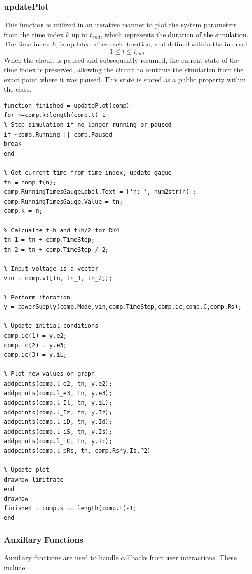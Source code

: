 \subsubsection{updatePlot}
This function is utilized in an iterative manner to plot the system parameters from the time index $k$ up to $t_{end}$, which represents the duration of the simulation. The time index $k$, is updated after each iteration, and defined within the interval $$1 \leq t \leq t_{end}$$ When the circuit is paused and subsequently resumed, the current state of the time index is preserved, allowing the circuit to continue the simulation from the exact point where it was paused. This state is stored as a public property within the class.
\begin{lstlisting}[caption=Helper function thats used to simulate the circuit after a given time index $k$]
function finished = updatePlot(comp)
for n=comp.k:length(comp.t)-1
% Stop simulation if no longer running or paused
if ~comp.Running || comp.Paused
break
end

% Get current time from time index, update gague
tn = comp.t(n);
comp.RunningTimesGaugeLabel.Text = ['n: ', num2str(n)];
comp.RunningTimesGauge.Value = tn;
comp.k = n;

% Calcualte t+h and t+h/2 for RK4
tn_1 = tn + comp.TimeStep;
tn_2 = tn + comp.TimeStep / 2;

% Input voltage is a vector
vin = comp.v([tn, tn_1, tn_2]);

% Perform iteration
y = powerSupply(comp.Mode,vin,comp.TimeStep,comp.ic,comp.C,comp.Rs);

% Update initial conditions
comp.ic(1) = y.e2;
comp.ic(2) = y.e3;
comp.ic(3) = y.iL;

% Plot new values on graph
addpoints(comp.l_e2, tn, y.e2);
addpoints(comp.l_e3, tn, y.e3);
addpoints(comp.l_Il, tn, y.iL);
addpoints(comp.l_Iz, tn, y.Iz);
addpoints(comp.l_iD, tn, y.Id);
addpoints(comp.l_iS, tn, y.Is);
addpoints(comp.l_iC, tn, y.Ic);
addpoints(comp.l_pRs, tn, comp.Rs*y.Is.^2)

% Update plot
drawnow limitrate
end
drawnow
finished = comp.k == length(comp.t)-1;
end
\end{lstlisting}

\subsubsection{Auxillary Functions}
Auxiliary functions are used to handle callbacks from user interactions. These include:

